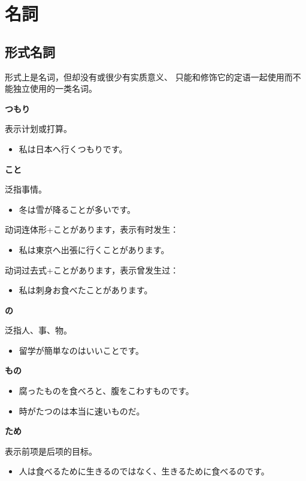 \section{名詞}%

\subsection{形式名詞}%

形式上是名词，但却没有或很少有实质意义、
只能和修饰它的定语一起使用而不能独立使用的一类名词。

{\bf
\noindent つもり
}

表示计划或打算。
\begin{itemize}
  \item 私は日本へ行くつもりです。
\end{itemize}

{\bf
\noindent こと
}

泛指事情。
\begin{itemize}
  \item 冬は雪が降ることが多いです。
\end{itemize}

动词连体形+ことがあります，表示有时发生：
\begin{itemize}
  \item 私は東京へ出張に行くことがあります。
\end{itemize}

动词过去式+ことがあります，表示曾发生过：
\begin{itemize}
  \item 私は刺身お食べたことがあります。
\end{itemize}

{\bf
\noindent の
}

泛指人、事、物。
\begin{itemize}
  \item 留学が簡単なのはいいことです。
\end{itemize}

{\bf
\noindent もの
}

\begin{itemize}
  \item 腐ったものを食べろと、腹をこわすものです。
  \item 時がたつのは本当に速いものだ。
\end{itemize}

{\bf
\noindent ため
}

表示前项是后项的目标。
\begin{itemize}
  \item 人は食べるために生きるのではなく、生きるために食べるのです。
\end{itemize}

